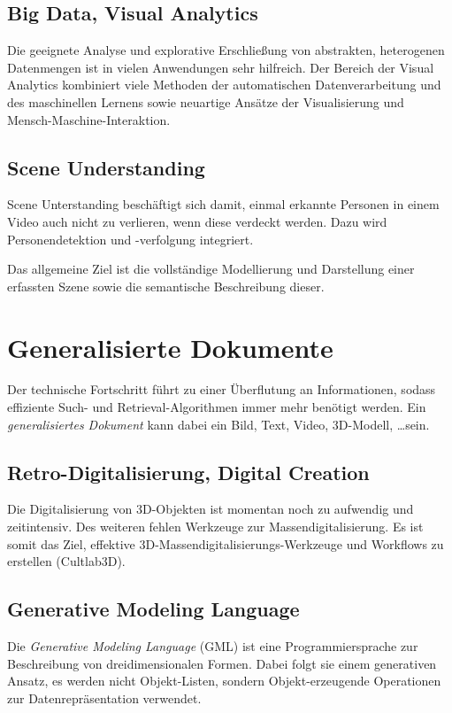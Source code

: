 		\subsection{Big Data, Visual Analytics}
			Die geeignete Analyse und explorative Erschließung von abstrakten, heterogenen Datenmengen ist in vielen Anwendungen sehr hilfreich. Der Bereich der Visual Analytics kombiniert viele Methoden der automatischen Datenverarbeitung und des maschinellen Lernens sowie neuartige Ansätze der Visualisierung und Mensch-Maschine-Interaktion.

		\subsection{Scene Understanding}
			Scene Unterstanding beschäftigt sich \zB damit, einmal erkannte Personen in einem Video auch nicht zu verlieren, wenn diese verdeckt werden. Dazu wird Personendetektion und -verfolgung integriert.
			
			Das allgemeine Ziel ist die vollständige Modellierung und Darstellung einer erfassten Szene sowie die semantische Beschreibung dieser.

	\section{Generalisierte Dokumente}
		Der technische Fortschritt führt zu einer Überflutung an Informationen, sodass effiziente Such- und Retrieval-Algorithmen immer mehr benötigt werden. Ein \emph{generalisiertes Dokument} kann dabei ein Bild, Text, Video, 3D-Modell, \dots sein.

		\subsection{Retro-Digitalisierung, Digital Creation}
			Die Digitalisierung von 3D-Objekten ist momentan noch zu aufwendig und zeitintensiv. Des weiteren fehlen Werkzeuge zur Massendigitalisierung. Es ist somit das Ziel, effektive 3D-Massendigitalisierungs-Werkzeuge und Workflows zu erstellen (\zB Cultlab3D).

		\subsection{Generative Modeling Language}
			Die \emph{Generative Modeling Language} (GML) ist eine Programmiersprache zur Beschreibung von dreidimensionalen Formen. Dabei folgt sie einem generativen Ansatz, \dh es werden nicht Objekt-Listen, sondern Objekt-erzeugende Operationen zur Datenrepräsentation verwendet.


